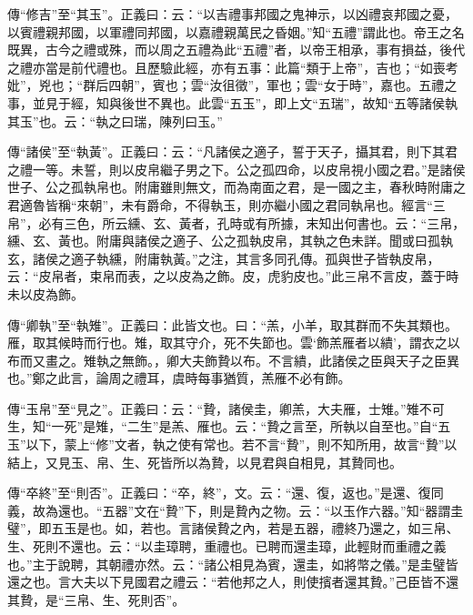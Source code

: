 {\noindent\zhuan{}\fzbyks 傳“修吉”至“其玉”。正義曰：云：“以吉禮事邦國之鬼神示，以凶禮哀邦國之憂，以賓禮親邦國，以軍禮同邦國，以嘉禮親萬民之昏姻。”知“五禮”謂此也。帝王之名既異，古今之禮或殊，而以周之五禮為此“五禮”者，以帝王相承，事有損益，後代之禮亦當是前代禮也。且歷驗此經，亦有五事：此篇“類于上帝”，吉也；“如喪考妣”，兇也；“群后四朝”，賓也；雲“汝徂徵”，軍也；雲“女于時”，嘉也。五禮之事，並見于經，知與後世不異也。此雲“五玉”，即上文“五瑞”，故知“五等諸侯執其玉”也。云：“執之曰瑞，陳列曰玉。” \par}

{\noindent\zhuan{}\fzbyks 傳“諸侯”至“執黃”。正義曰：云：“凡諸侯之適子，誓于天子，攝其君，則下其君之禮一等。未誓，則以皮帛繼子男之下。公之孤四命，以皮帛視小國之君。”是諸侯世子、公之孤執帛也。附庸雖則無文，而為南面之君，是一國之主，春秋時附庸之君適魯皆稱“來朝”，未有爵命，不得執玉，則亦繼小國之君同執帛也。經言“三帛”，必有三色，所云纁、玄、黃者，孔時或有所據，末知出何書也。云：“三帛，纁、玄、黃也。附庸與諸侯之適子、公之孤執皮帛，其執之色未詳。聞或曰孤執玄，諸侯之適子執纁，附庸執黃。”之注，其言多同孔傳。孤與世子皆執皮帛，云：“皮帛者，束帛而表，之以皮為之飾。皮，虎豹皮也。”此三帛不言皮，蓋于時未以皮為飾。 \par}

{\noindent\zhuan{}\fzbyks 傳“卿執”至“執雉”。正義曰：此皆文也。曰：“羔，小羊，取其群而不失其類也。雁，取其候時而行也。雉，取其守介，死不失節也。雲‘飾羔雁者以繢’，謂衣之以布而又畫之。雉執之無飾。，卿大夫飾贄以布。不言繢，此諸侯之臣與天子之臣異也。”鄭之此言，論周之禮耳，虞時每事猶質，羔雁不必有飾。 \par}

{\noindent\zhuan{}\fzbyks 傳“玉帛”至“見之”。正義曰：云：“贄，諸侯圭，卿羔，大夫雁，士雉。”雉不可生，知“一死”是雉，“二生”是羔、雁也。云：“贄之言至，所執以自至也。”自“五玉”以下，蒙上“修”文者，執之使有常也。若不言“贄”，則不知所用，故言“贄”以結上，又見玉、帛、生、死皆所以為贄，以見君與自相見，其贄同也。 \par}

{\noindent\zhuan{}\fzbyks 傳“卒終”至“則否”。正義曰：“卒，終”，文。云：“還、復，返也。”是還、復同義，故為還也。“五器”文在“贄”下，則是贄內之物。云：“以玉作六器。”知“器謂圭璧”，即五玉是也。如，若也。言諸侯贄之內，若是五器，禮終乃還之，如三帛、生、死則不還也。云：“以圭璋聘，重禮也。已聘而還圭璋，此輕財而重禮之義也。”主于說聘，其朝禮亦然。云：“諸公相見為賓，還圭，如將幣之儀。”是圭璧皆還之也。言大夫以下見國君之禮云：“若他邦之人，則使擯者還其贄。”己臣皆不還其贄，是“三帛、生、死則否”。 \par}


